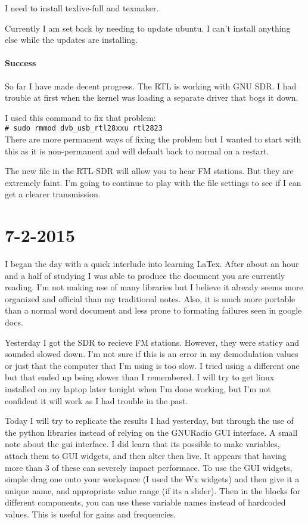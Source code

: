 \documentclass{article}
\newcommand{\shellcmd}[1]{\\\indent\indent\texttt{\footnotesize\# #1}\\}
\begin{document}
	I need to install texlive-full and texmaker. 

	Currently I am set back by needing to update ubuntu. I can't install
	anything else while the updates are installing. 
	
	\paragraph{Success}
		
		
	So far I have made decent progress. The RTL is working with GNU SDR. I had trouble
	at first when the kernel was loading a separate driver that bogs it down. 

	I used this command to fix that problem:
	\shellcmd{sudo rmmod dvb\_usb\_rtl28xxu rtl2823}

	There are more permanent ways of fixing the problem but I wanted to start
	with this as it is non-permanent and will default back to normal on a restart. 

	The new file in the RTL-SDR will allow you to hear FM stations. But 
	they are extremely faint. I'm going to continue to play with the file settings to
	see if I can get a clearer transmission. 
	\newpage
	\section{7-2-2015}

	I began the day with a quick interlude into learning LaTex. After about an hour
	and a half of studying I was able to produce the document you are currently reading.
	I'm not making use of many libraries but I believe it already seems more 
	organized and official than my traditional notes. Also, it is much more portable
	than a normal word document and less prone to formating failures seen in google docs. 
	
	Yesterday I got the SDR to recieve FM stations. However, they were staticy and sounded
	slowed down. I'm not sure if this is an error in my demodulation values or just that
	the computer that I'm using is too slow. I tried using a different one but that ended 
	up being slower than I remembered. I will try to get linux installed on my laptop later
	tonight when I'm done working, but I'm not confident it will work as I had trouble in the past. 

	Today I will try to replicate the results I had yesterday, but through the use of the python
	libraries instead of relying on the GNURadio GUI interface. A small note about the gui interface.
	I did learn that its possible to make variables, attach them to GUI widgets, and then alter then live. 
	It appears that having more than 3 of these can severely impact performace. To use the GUI widgets,
	simple drag one onto your workspace (I used the Wx widgets) and then give it a unique name, and 
	appropriate value range (if its a slider). Then in the blocks for different components, you can use 
	these variable names instead of hardcoded values. This is useful for gains and frequencies. 
\end{document}
